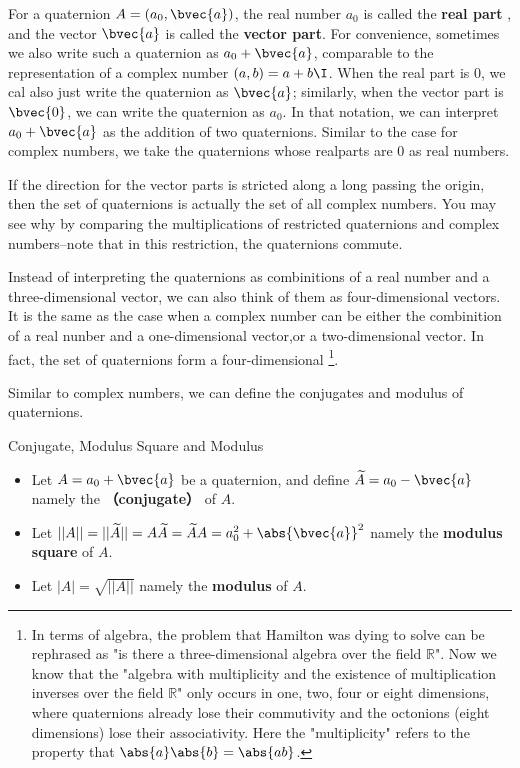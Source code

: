 For a quaternion $A=(a_0, \bvec{a})$, the real number $a_0$ is called the \textbf{real part} , and the vector $\bvec{a}$ is called the \textbf{vector part}. For convenience, sometimes we also write such a quaternion as $a_0+\bvec{a}$, comparable to the representation of a complex number $(a, b)=a+b\I$. When the real part is $0$, we cal also just write the quaternion as $\bvec{a}$; similarly, when the vector part is $\bvec{0}$, we can write the quaternion as $a_0$. In that notation, we can interpret $a_0+\bvec{a}$ as the addition of two quaternions. Similar to the case for complex numbers, we take the quaternions whose realparts are $0$ as real numbers. 


If the direction for the vector parts is stricted along a long passing the origin, then the set of quaternions is actually the set of all complex numbers. You may see why by comparing the multiplications of restricted quaternions and complex numbers--note that in this restriction, the quaternions commute. 

Instead of interpreting the quaternions as combinitions of a real number and a three-dimensional vector, we can also think of them as four-dimensional vectors. It is the same as the case when a complex number can be either the combinition of a real nunber and a one-dimensional vector,or a two-dimensional vector. In fact, the set of quaternions form a four-dimensional \footnote{In terms of algebra, the problem that Hamilton was dying to solve can be rephrased as "is there a three-dimensional algebra over the field $\mathbb{R}$". Now we know that the "algebra with multiplicity and the existence of multiplication inverses over the field $\mathbb{R}$" only occurs in one, two, four or eight dimensions, where quaternions already lose their commutivity and the octonions (eight dimensions) lose their associativity. Here the "multiplicity" refers to the property that $\abs{a}\abs{b}=\abs{ab}$. }.

Similar to complex numbers, we can define the conjugates and modulus of quaternions. 



\begin{definition}{Conjugate, Modulus Square and Modulus}
\begin{itemize}
\item Let $A=a_0+\bvec{a}$ be a quaternion, and define $\widetilde{A}=a_0-\bvec{a}$ namely the \textbf{（conjugate）} of $A$. 
\item Let $||A||=||\widetilde{A}||=A\widetilde{A}=\widetilde{A}A=a_0^2+ \abs{\bvec{a}}^2$ namely the \textbf{modulus square} of $A$. 
\item Let $|A|=\sqrt{||A||}$ namely the \textbf{modulus} of $A$. 
\end{itemize}
\end{definition}

